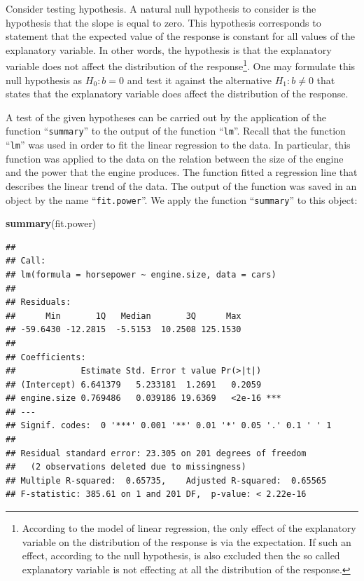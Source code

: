\documentclass[]{krantz}
\makeatletter
\newenvironment{Shaded}{\begin{snugshade}}{\end{snugshade}}
\newcommand{\KeywordTok}[1]{\textcolor[rgb]{0.13,0.29,0.53}{\textbf{#1}}}
\newcommand{\NormalTok}[1]{#1}
\newenvironment{kframe}{%
\medskip{}
\setlength{\fboxsep}{.8em}
 \def\at@end@of@kframe{}%
 \ifinner\ifhmode%
  \def\at@end@of@kframe{\end{minipage}}%
  \begin{minipage}{\columnwidth}%
 \fi\fi%
 \def\FrameCommand##1{\hskip\@totalleftmargin \hskip-\fboxsep
 \colorbox{shadecolor}{##1}\hskip-\fboxsep
     \hskip-\linewidth \hskip-\@totalleftmargin \hskip\columnwidth}%
 \MakeFramed {\advance\hsize-\width
   \@totalleftmargin\z@ \linewidth\hsize
   \@setminipage}}%
 {\par\unskip\endMakeFramed%
 \at@end@of@kframe}
\renewenvironment{Shaded}{\begin{kframe}}{\end{kframe}}
\theoremstyle{definition}
\theoremstyle{definition}
\theoremstyle{definition}
\theoremstyle{remark}
\makeatother
\begin{document}
Consider testing hypothesis. A natural null hypothesis to consider is
the hypothesis that the slope is equal to zero. This hypothesis
corresponds to statement that the expected value of the response is
constant for all values of the explanatory variable. In other words, the
hypothesis is that the explanatory variable does not affect the
distribution of the response\footnote{According to the model of linear
  regression, the only effect of the explanatory variable on the
  distribution of the response is via the expectation. If such an
  effect, according to the null hypothesis, is also excluded then the so
  called explanatory variable is not effecting at all the distribution
  of the response.}. One may formulate this null hypothesis as
\(H_0:b = 0\) and test it against the alternative \(H_1: b \not= 0\)
that states that the explanatory variable does affect the distribution
of the response.

A test of the given hypotheses can be carried out by the application of
the function ``\texttt{summary}'' to the output of the function
``\texttt{lm}''. Recall that the function ``\texttt{lm}'' was used in
order to fit the linear regression to the data. In particular, this
function was applied to the data on the relation between the size of the
engine and the power that the engine produces. The function fitted a
regression line that describes the linear trend of the data. The output
of the function was saved in an object by the name
``\texttt{fit.power}''. We apply the function ``\texttt{summary}'' to
this object:

\begin{Shaded}
\begin{Highlighting}[]
\KeywordTok{summary}\NormalTok{(fit.power)}
\end{Highlighting}
\end{Shaded}

\begin{verbatim}
## 
## Call:
## lm(formula = horsepower ~ engine.size, data = cars)
## 
## Residuals:
##      Min       1Q   Median       3Q      Max 
## -59.6430 -12.2815  -5.5153  10.2508 125.1530 
## 
## Coefficients:
##             Estimate Std. Error t value Pr(>|t|)    
## (Intercept) 6.641379   5.233181  1.2691   0.2059    
## engine.size 0.769486   0.039186 19.6369   <2e-16 ***
## ---
## Signif. codes:  0 '***' 0.001 '**' 0.01 '*' 0.05 '.' 0.1 ' ' 1
## 
## Residual standard error: 23.305 on 201 degrees of freedom
##   (2 observations deleted due to missingness)
## Multiple R-squared:  0.65735,    Adjusted R-squared:  0.65565 
## F-statistic: 385.61 on 1 and 201 DF,  p-value: < 2.22e-16
\end{verbatim}
\end{document}
